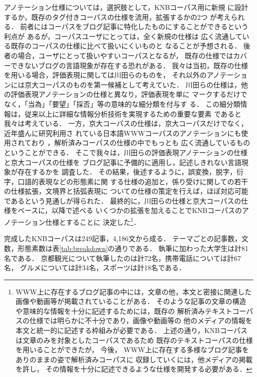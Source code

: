 \documentclass[japanese]{jnlp_JS2.0}
\begin{document}
アノテーション仕様については，選択肢として，KNBコーパス用に新規
に設計するか，既存のタグ付きコーパスの仕様を流用，拡張するかの2つ
が考えられる．
前者にはコーパスをブログ記事に特化したものにすることができるという利点が
あるが，コーパスユーザにとっては，全く新規の仕様は
広く流通している既存のコーパスの仕様に比べて扱いにくいものと
なることが予想される．
後者の場合，ユーザにとって扱いやすいコーパスとなるが，
既存の仕様ではカバーできないブログの言語現象が存在する恐れがある．
我々は当初，既存の仕様を用いる場合，評価表現に関しては川田らのものを，
それ以外のアノテーションには京大コーパスのものを第一候補として考えていた．
川田らの仕様は，他の評価表現アノテーションの仕様と異なり，評価表現を単に
マークするだけでなく，「当為」「要望」「採否」等の意味的な細分類を付与す
る．
この細分類情報は，従来以上に詳細な情報分析技術を実現するための重要な要素
であると我々は考えている．
一方，京大コーパスの仕様は，京大コーパスだけでなく，近年盛んに研究利用さ
れている日本語WWWコーパスのアノテーションにも使用されており
\cite{新里:橋本:河原:黒橋:2007}，解析済みコーパスの仕様の中でもっとも
広く流通しているものということができる．
そこで我々は，川田らの評価表現アノテーションの仕様と京大コーパスの仕様を
ブログ記事に予備的に適用し，記述しきれない言語現象が存在するかを
調査した．
その結果，後述するように，誤変換，脱字，衍字，口語的表現などの形態素に関
する仕様の追加と，係り受けに関しての若干の仕様拡張，文境界と括弧表現に
ついての仕様の策定を行えば，ほぼ対応可能であるという見通しが得られた．
最終的に，川田らの仕様と京大コーパスの仕様をベースに，以降で述べる
いくつかの拡張を加えることでKNBコーパスのアノテーション仕様とすることに
決定した\footnote{WWW上に存在するブログ記事の中には，文章の他，本文と密接に関連した
画像や動画等が掲載されていることがある．
そのような記事の文章の構造や意味的な情報を十分に記述するためには，既存の
解析済みテキストコーパスの仕様では明らかに不十分であり，画像や動画等の
他のメディアの情報を本文と統一的に記述する枠組みが必要である．
上述の通り，KNBコーパスは文章のみを対象としたコーパスであるため
既存のテキストコーパスの仕様を用いることができたが，
今後，
WWW上に存在する多様なブログ記事をありのままの姿で解析済みコーパスに
収録していくには，他メディアの掲載を許し，
その情報を十分に記述できるような仕様を開発する必要がある．}．

完成したKNBコーパスは249記事，4,186文から成る．
テーマごとの記事数，文数，形態素数は表\ref{tab:breakdown}の通りである．
執筆に加わった大学生は計81名である．
京都観光について執筆したのは計72名，携帯電話については計67名，
グルメについては計34名，スポーツは計18名である．
\end{document}
